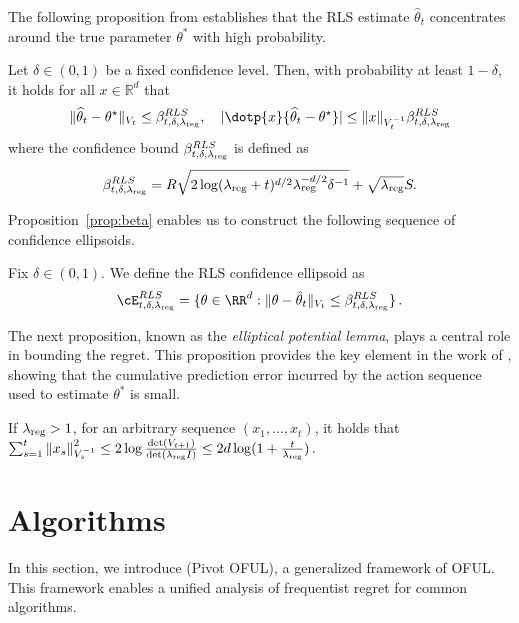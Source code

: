 The following proposition from \cite{abbasi2011improved} establishes that the RLS estimate $\hat{\theta}_t$ concentrates around the true parameter $\theta^*$ with high probability.

\begin{proposition}\label{prop:beta}
	Let $\delta \in (0,1)$ be a fixed confidence level. Then, with probability at least $1-\delta$, it holds for all $x \in \mathbb{R}^d$ that
	\begin{align*}
		\|\widehat{\theta}_t-\theta^{\star}\|_{V_t} \leq \beta_{t,\delta, \lambdareg}^{RLS}, \quad 
		|\dotp{x}{\widehat{\theta}_t-\theta^{\star}}| \leq\|x\|_{V_t^{-1}} \beta_{t,\delta, \lambdareg}^{RLS}
	\end{align*}
	where the confidence bound $\beta_{t,\delta, \lambda_{\text{reg}}}^{RLS}$ is defined as
	\begin{equation}\label{eq:beta_rls}
		\beta_{t,\delta, \lambda_{\text{reg}}}^{RLS} = R \sqrt{2 \log (\lambda_{\text{reg}}+t)^{d / 2} \lambda_{\text{reg}}^{-d / 2}{\delta}^{-1}} + \sqrt{\lambda_{\text{reg}}} S.
	\end{equation}
\end{proposition}

 Proposition~\ref{prop:beta} enables us to construct the following sequence of confidence ellipsoids.
\begin{definition}
	\label{def:rls}
	Fix $\delta\in (0,1)$. We define the RLS confidence ellipsoid as	
	\[
	\cE_{t,\delta, \lambdareg}^{RLS}= \{\theta \in \RR^d: \|\theta - \hparam_t\|_{V_t}\leq \beta_{t,\delta, \lambdareg}^{RLS} \}\,.
	\]
\end{definition}

The next proposition, known as the \emph{elliptical potential lemma}, plays a central role in bounding the regret. This proposition provides the key element in the work of \cite{abbasi2011improved}, showing that the cumulative prediction error incurred by the action sequence used to estimate $\theta^*$ is small.

\begin{proposition} \label{prop:potential}
	If $\lambda_{\text{reg}} >1$, for an arbitrary sequence $(x_1,\dots,x_t)$, it holds that
	$
	\sum_{s=1}^t\left\|x_s\right\|_{V_s^{-1}}^2 \leq 2 \log \frac{\operatorname{det}\left(V_{t+1}\right)}{\operatorname{det}(\lambda_{\text{reg}} I)} \leq 2 d \log (1+\frac{t}{\lambda_{\text{reg}}})\,.
	$

\end{proposition}


\section{\POFUL{} Algorithms}
\label{sec:POFUL}
In this section, we introduce \POFUL{} (Pivot OFUL), a generalized framework of OFUL. This framework enables a unified analysis of frequentist regret for common algorithms.

